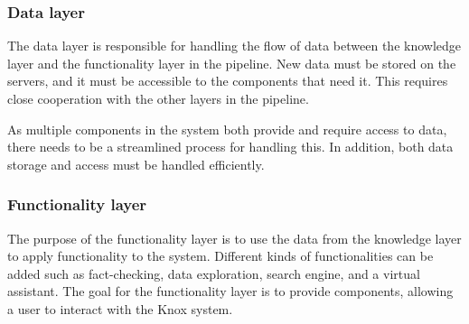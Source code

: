 \subsubsection{Data layer}\label{databaseResponsibility}
The data layer is responsible for handling the flow of data between the knowledge layer and the functionality layer in the \knox{} pipeline.
New data must be stored on the servers, and it must be accessible to the components that need it. 
This requires close cooperation with the other layers in the pipeline.


As multiple components in the \knox{} system both provide and require access to data, there needs to be a streamlined process for handling this.
In addition, both data storage and access must be handled efficiently.

\subsubsection{Functionality layer}
The purpose of the functionality layer is to use the data from the knowledge layer to apply functionality to the system.
Different kinds of functionalities can be added such as fact-checking, data exploration, search engine, and a virtual assistant.
 The goal for the functionality layer is to provide components, allowing a user to interact with the Knox system. 
